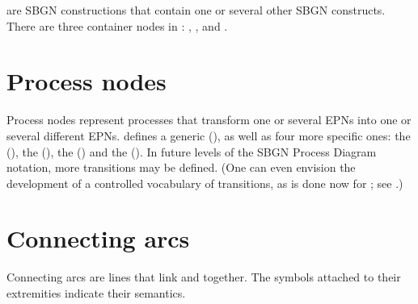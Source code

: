  are SBGN constructions that contain one or several other SBGN constructs.  There are three container nodes in \SBGNPDLone: , , and .







\section{Process nodes}\label{sec:PNs}

Process nodes represent processes that transform one or several EPNs into one or several different EPNs.   \SBGNPDLone defines a generic  (), as well as four more specific ones: the  (), the  (), the  () and the  ().  In future levels of the SBGN Process Diagram notation, more transitions may be defined.  (One can even envision the development of a controlled vocabulary of transitions, as is done now for ; see .)









\section{Connecting arcs}\label{sec:arcs}

Connecting arcs are lines that link  and  together.  The symbols attached to their extremities indicate their semantics.

